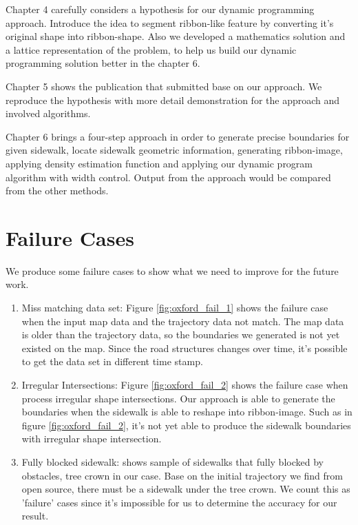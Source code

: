 Chapter 4 carefully considers a hypothesis for our dynamic programming approach. Introduce the idea to segment ribbon-like feature by converting it's original shape into ribbon-shape. Also we developed a mathematics solution and a lattice representation of the problem, to help us build our dynamic programming solution better in the chapter 6.

Chapter 5 shows the publication that submitted base on our approach. We reproduce the hypothesis with more detail demonstration for the approach and involved algorithms. 

Chapter 6 brings a four-step approach in order to generate precise boundaries for given sidewalk, locate sidewalk geometric information, generating ribbon-image, applying density estimation function and applying our dynamic program algorithm with width control. Output from the approach would be compared from the other methods.

\section{Failure Cases}

We produce some failure cases to show what we need to improve for the future work. 

\begin{enumerate}
    \item Miss matching data set: Figure \ref{fig:oxford_fail_1} shows the failure case when the input map data and the trajectory data not match. The map data is older than the trajectory data, so the boundaries we generated is not yet existed on the map. Since the road structures changes over time, it's possible to get the data set in different time stamp. 
    \item Irregular Intersections: Figure \ref{fig:oxford_fail_2} shows the failure case when process irregular shape intersections. Our approach is able to generate the boundaries when the sidewalk is able to reshape into ribbon-image. Such as in figure \ref{fig:oxford_fail_2}, it's not yet able to produce the sidewalk boundaries with irregular shape intersection.
    \item Fully blocked sidewalk:  shows sample of sidewalks that fully blocked by obstacles, tree crown in our case. Base on the initial trajectory we find from open source, there must be a sidewalk under the tree crown. We count this as 'failure' cases since it's impossible for us to determine the accuracy for our result. 
\end{enumerate}

